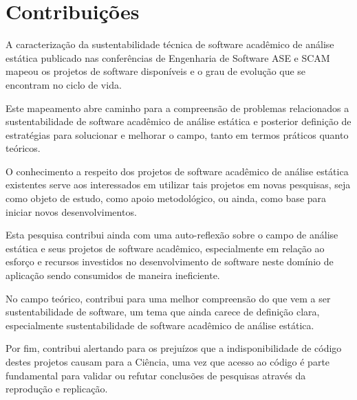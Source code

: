 \section{Contribuições}

A caracterização da sustentabilidade técnica de software acadêmico de análise estática
publicado nas conferências de Engenharia de Software ASE e SCAM 
mapeou os projetos de software disponíveis e o grau de evolução que
se encontram no ciclo de vida.

Este mapeamento abre caminho para a compreensão de problemas relacionados a 
sustentabilidade de software acadêmico de análise estática 
e posterior definição de estratégias para
solucionar e melhorar o campo, tanto em termos práticos quanto teóricos.

O conhecimento a respeito dos projetos de software acadêmico de análise estática
existentes serve aos interessados em utilizar tais projetos em novas pesquisas,
seja como objeto de estudo, como apoio metodológico, ou ainda, como base para
iniciar novos desenvolvimentos.


Esta pesquisa contribui ainda com uma auto-reflexão sobre o campo de análise
estática e seus projetos de software acadêmico, especialmente em relação ao
esforço e recursos investidos no desenvolvimento de software neste domínio de
aplicação sendo consumidos de maneira ineficiente.


No campo teórico, contribui para uma melhor compreensão do que vem a ser
sustentabilidade de software, um tema que ainda carece de definição clara,
especialmente sustentabilidade de software acadêmico de análise estática.


Por fim, contribui alertando para os prejuízos que a indisponibilidade de
código destes projetos causam para a Ciência, uma vez que acesso ao código é
parte fundamental para validar ou refutar conclusões de pesquisas através da
reprodução e replicação.


